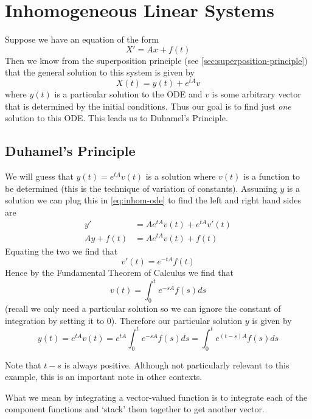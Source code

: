 \section{Inhomogeneous Linear Systems}
Suppose we have an equation of the form
\begin{equation}\label{eq:inhom-ode}
    X' = Ax + f(t)
\end{equation}
Then we know from the superposition principle (see \autoref{sec:superposition-principle}) that the general solution to this system is given by
$$ X(t) = y(t) + e^{tA}v $$
where $y(t)$ is a particular solution to the ODE and $v$ is some arbitrary vector that is determined by the initial conditions. Thus our goal is to find just \textit{one} solution to this ODE. This leads us to Duhamel's Principle.

\subsection{Duhamel's Principle}
We will guess that $y(t) = e^{tA} v(t)$ is a solution where $v(t)$ is a function to be determined (this is the technique of variation of constants). Assuming $y$ is a solution we can plug this in \autoref{eq:inhom-ode} to find the left and right hand sides are
\begin{align}
    y' &= Ae^{tA} v(t) + e^{tA} v'(t) \tag{LHS}\\
    Ay + f(t) &= Ae^{tA} v(t) + f(t) \tag{RHS}
\end{align}
Equating the two we find that
$$ v'(t) = e^{-tA} f(t) $$
Hence by the Fundamental Theorem of Calculus we find that 
$$ v(t) = \int_{0}^{t} e^{-sA} f(s) ds $$
(recall we only need a particular solution so we can ignore the constant of integration by setting it to 0). 
Therefore our particular solution $y$ is given by
$$ y(t) = e^{tA} v(t) = e^{tA} \int_{0}^t e^{-sA} f(s) ds = \int_{0}^t e^{(t - s)A} f(s) ds $$
\begin{remark}
Note that $t - s$ is always positive. Although not particularly relevant to this example, this is an important note in other contexts.
\end{remark}
\begin{remark}
What we mean by integrating a vector-valued function is to integrate each of the component functions and `stack' them together to get another vector.
\end{remark}

